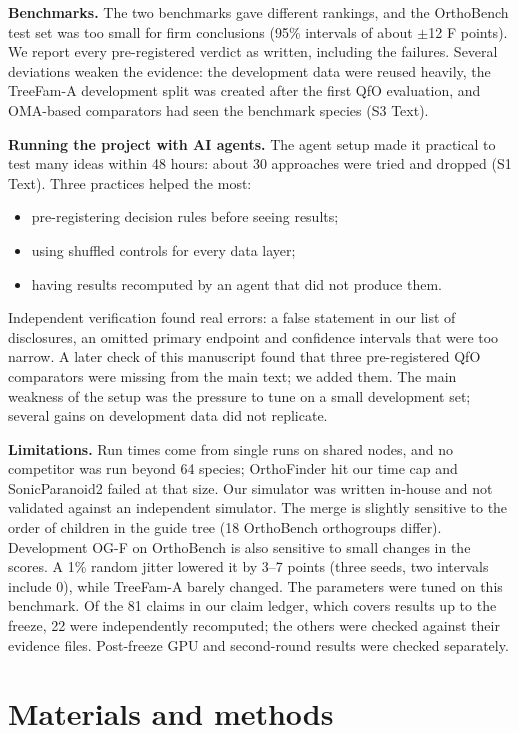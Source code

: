 \textbf{Benchmarks.} The two benchmarks gave different rankings, and the OrthoBench test set was too small for firm conclusions (95\% intervals of about $\pm$12 F points). We report every pre-registered verdict as written, including the failures. Several deviations weaken the evidence: the development data were reused heavily, the TreeFam-A development split was created after the first QfO evaluation, and OMA-based comparators had seen the benchmark species (S3 Text).

\textbf{Running the project with AI agents.} The agent setup made it practical to test many ideas within 48 hours: about 30 approaches were tried and dropped (S1 Text). Three practices helped the most:
\begin{itemize}
\item pre-registering decision rules before seeing results;
\item using shuffled controls for every data layer;
\item having results recomputed by an agent that did not produce them.
\end{itemize}
Independent verification found real errors: a false statement in our list of disclosures, an omitted primary endpoint and confidence intervals that were too narrow. A later check of this manuscript found that three pre-registered QfO comparators were missing from the main text; we added them. The main weakness of the setup was the pressure to tune on a small development set; several gains on development data did not replicate.

\textbf{Limitations.} Run times come from single runs on shared nodes, and no competitor was run beyond 64 species; OrthoFinder hit our time cap and SonicParanoid2 failed at that size. Our simulator was written in-house and not validated against an independent simulator. The merge is slightly sensitive to the order of children in the guide tree (18 OrthoBench orthogroups differ). Development OG-F on OrthoBench is also sensitive to small changes in the scores. A 1\% random jitter lowered it by 3--7 points (three seeds, two intervals include 0), while TreeFam-A barely changed. The parameters were tuned on this benchmark. Of the 81 claims in our claim ledger, which covers results up to the freeze, 22 were independently recomputed; the others were checked against their evidence files. Post-freeze GPU and second-round results were checked separately.

\section*{Materials and methods}

